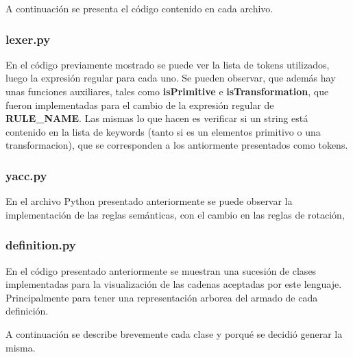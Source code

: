 A continuaci\'on se presenta el c\'odigo contenido en cada archivo.

\newpage
\subsubsection{lexer.py}



En el c\'odigo previamente mostrado se puede ver la lista de tokens utilizados, luego la expresi\'on regular para cada uno. Se pueden observar, que adem\'as hay unas funciones auxiliares, tales como \textbf{isPrimitive} e \textbf{isTransformation}, que fueron implementadas para el cambio de la expresi\'on regular de \textbf{RULE\_NAME}. Las mismas lo que hacen es verificar si un string est\'a contenido en la lista de keywords (tanto si es un elementos primitivo o una transformacion), que se corresponden a los antiormente presentados como tokens.

\newpage
\subsubsection{yacc.py}



En el archivo Python presentado anteriormente se puede observar la implementaci\'on de las reglas sem\'anticas, con el cambio en las reglas de rotaci\'on, 

\newpage
\subsubsection{definition.py}



En el c\'odigo presentado anteriormente se muestran una sucesi\'on de clases implementadas para la visualizaci\'on de las cadenas aceptadas por este lenguaje. Principalmente para tener una representaci\'on arborea del armado de cada definici\'on.

A continuaci\'on se describe brevemente cada clase y porqu\'e se decidi\'o generar la misma.

